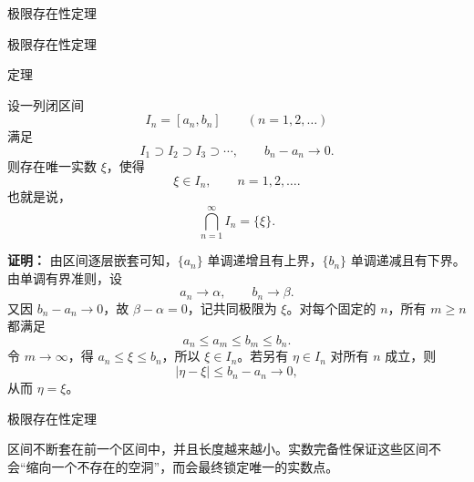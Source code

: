 \documentclass[aspectratio=169,10pt,fontset=fandol]{ctexbeamer}
\begin{document}
\begin{frame}[t,fragile]{极限存在性定理}
\normalsize
{\normalsize



\iffalse


}
\end{frame}
\begin{frame}[t,fragile]{极限存在性定理}
\normalsize
\begin{block}{定理}
{\normalsize

设一列闭区间
\[
I_n=[a_n,b_n]\qquad(n=1,2,\ldots)
\]
满足
\[
I_1\supset I_2\supset I_3\supset\cdots,
\qquad b_n-a_n\to0.
\]
则存在唯一实数 \(\xi\)，使得
\[
\xi\in I_n,\qquad n=1,2,\ldots.
\]
也就是说，
\[
\bigcap_{n=1}^{\infty}I_n=\{\xi\}.
\]

}
\end{block}
\pause
{\normalsize
\textbf{证明：}
由区间逐层嵌套可知，\(\{a_n\}\) 单调递增且有上界，\(\{b_n\}\) 单调递减且有下界。由单调有界准则，设
\[
a_n\to\alpha,\qquad b_n\to\beta.
\]
又因 \(b_n-a_n\to0\)，故 \(\beta-\alpha=0\)，记共同极限为 \(\xi\)。对每个固定的 \(n\)，所有 \(m\ge n\) 都满足
\[
a_n\le a_m\le b_m\le b_n.
\]
令 \(m\to\infty\)，得 \(a_n\le\xi\le b_n\)，所以 \(\xi\in I_n\)。若另有 \(\eta\in I_n\) 对所有 \(n\) 成立，则
\[
|\eta-\xi|\le b_n-a_n\to0,
\]
从而 \(\eta=\xi\)。

}
\end{frame}
\begin{frame}[t,fragile]{极限存在性定理}
\normalsize
{\normalsize
区间不断套在前一个区间中，并且长度越来越小。实数完备性保证这些区间不会“缩向一个不存在的空洞”，而会最终锁定唯一的实数点。
\begin{center}
\end{center}

}
\end{frame}
\end{document}
